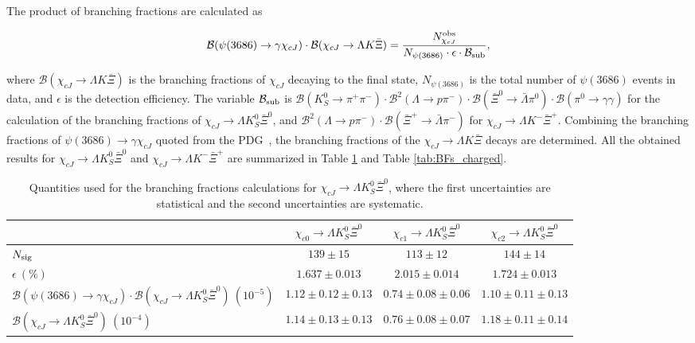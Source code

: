 \documentclass[amsmath,amssymb,twocolumn,prd,floatfix,showpacs,nofootinbib]{revtex4-1}
\begin{document}
The product of branching fractions are calculated as
\begin{linenomath*}
	\begin{equation}
		{\mathcal B}(\psi(3686)\to \gamma\chi_{cJ}) \cdot \mathcal{B}(\chi_{cJ}\to \Lambda K \bar \Xi)
		=\frac{N^{\rm obs}_{\chi_{cJ}}}{N_{\psi(3686)}\cdot\epsilon \cdot \mathcal B_{\rm sub}},
	\end{equation}
\end{linenomath*}
where $\mathcal{B}(\chi_{cJ}\to \Lambda K \bar \Xi)$ is the branching fractions of $\chi_{cJ}$ decaying to the final state, $N_{\psi(3686)}$ is the total number of $\psi(3686)$ events in data, and $\epsilon$ is the detection efficiency. The variable $\mathcal B_{\rm sub}$ is
$\mathcal B(K^0_S \to \pi^+ \pi^-) \cdot \mathcal B^2(\Lambda  \to p \pi^-) \cdot \mathcal B(\bar\Xi^0  \to\bar \Lambda \pi^0)
\cdot \mathcal B(\pi^0 \to \gamma\gamma)$ for the calculation of the branching fractions of  $\chi_{cJ} \to \Lambda K^0_S \bar \Xi^0$, and
$\mathcal B^2(\Lambda  \to p \pi^-) \cdot \mathcal B(\bar\Xi^+  \to\bar \Lambda \pi^-)$
for $\chi_{cJ} \to \Lambda K^-\bar \Xi^+$.
Combining the branching fractions of $\psi(3686)\to\gamma\chi_{cJ}$ quoted from the PDG~\cite{ref::pdg2024}, 
the branching fractions of the $\chi_{cJ} \to \Lambda K \bar \Xi$ decays are determined. All the obtained results for $\chi_{cJ}\to \Lambda K^0_S \bar \Xi^0$ and $\chi_{cJ}\to \Lambda K^- \bar \Xi^+$ are summarized in Table \ref{tab:BFs_neutral} and Table \ref{tab:BFs_charged}.

\begin{table}[htbp]
	\caption{Quantities used for  the branching fractions calculations for $\chi_{cJ} \to \Lambda K^0_S\bar \Xi^0$, where the first uncertainties are statistical and the second uncertainties are systematic.}
	\centering
		\begin{tabular}{lccc}
			\hline\hline
			& $ \chi_{c0}\to \Lambda K^0_S\bar{\Xi}^0$ & $ \chi_{c1}\to \Lambda K^0_S\bar{\Xi}^0$ & $ \chi_{c2}\to \Lambda K^0_S\bar{\Xi}^0 $ \\ 
			\hline   
			$N_{\rm sig}$ & $139\pm15$ & $113\pm12$ & $144\pm14$ \\ 
			$\epsilon~(\%)$ & $1.637\pm0.013$ & $2.015\pm0.014$ & $1.724\pm0.013$ \\
			$\mathcal{B}(\psi(3686)\to \gamma \chi_{cJ})\cdot\mathcal{B}(\chi_{cJ}\to \Lambda K^0_S\bar \Xi^0)~(10^{-5})$ & $1.12\pm0.12\pm0.13$ & $0.74\pm0.08\pm0.06$ & $1.10\pm0.11\pm0.13$ \\ 
			$\mathcal{B}(\chi_{cJ}\to \Lambda K^0_S\bar \Xi^0)~(10^{-4})$  & $1.14\pm0.13\pm0.13$ & $0.76\pm0.08\pm0.07$ & $1.18\pm0.11\pm0.14$ \\ \hline 
			\hline
		\end{tabular}
		\label{tab:BFs_neutral}
	\end{table}
	
\end{document}
